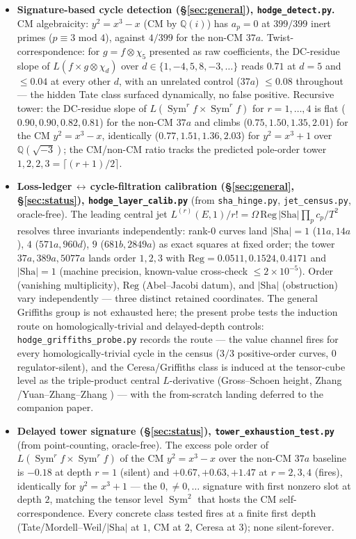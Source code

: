 \documentclass[11pt]{article}
\theoremstyle{definition}
\newcommand{\Sym}{\operatorname{Sym}}
\newcommand{\Sha}{\mathrm{Sha}}
\begin{document}
\begin{itemize}
\item \textbf{Signature-based cycle detection (\S\ref{sec:general}), \texttt{hodge\_detect.py}.} CM
algebraicity: $y^2=x^3-x$ (CM by $\mathbb Q(i)$) has $a_p=0$ at $399/399$ inert primes ($p\equiv3$ mod $4$),
against $4/399$ for the non-CM $37a$. Twist-correspondence: for $g=f\otimes\chi_5$ presented as raw
coefficients, the DC-residue slope of $L(f\times g\otimes\chi_d)$ over $d\in\{1,-4,5,8,-3,\dots\}$ reads
$0.71$ at $d=5$ and $\le0.04$ at every other $d$, with an unrelated control ($37a$) $\le0.08$ throughout ---
the hidden Tate class surfaced dynamically, no false positive. Recursive tower: the DC-residue slope of
$L(\Sym^r f\times\Sym^r f)$ for $r=1,\dots,4$ is flat ($0.90,0.90,0.82,0.81$) for the non-CM $37a$ and
climbs ($0.75,1.50,1.35,2.01$) for the CM $y^2=x^3-x$, identically ($0.77,1.51,1.36,2.03$) for
$y^2=x^3+1$ over $\mathbb Q(\sqrt{-3})$; the CM/non-CM ratio tracks the predicted pole-order tower
$1,2,2,3=\lceil(r{+}1)/2\rceil$.

\item \textbf{Loss-ledger\,$\leftrightarrow$\,cycle-filtration calibration (\S\ref{sec:general},
\S\ref{sec:status}), \texttt{hodge\_layer\_calib.py}} (from \texttt{sha\_hinge.py}, \texttt{jet\_census.py},
oracle-free). The leading central jet $L^{(r)}(E,1)/r!=\Omega\,\mathrm{Reg}\,|\Sha|\prod_p c_p/T^2$ resolves
three invariants independently: rank-$0$ curves land $|\Sha|=1$ ($11a,14a$), $4$ ($571a,960d$), $9$
($681b,2849a$) as exact squares at fixed order; the tower $37a,389a,5077a$ lands order $1,2,3$ with
$\mathrm{Reg}=0.0511,0.1524,0.4171$ and $|\Sha|=1$ (machine precision, known-value cross-check $\le
2\times10^{-5}$). Order (vanishing multiplicity), $\mathrm{Reg}$ (Abel--Jacobi datum), and $|\Sha|$
(obstruction) vary independently --- three distinct retained coordinates. The general Griffiths group is
not exhausted here; the present probe tests the induction route on homologically-trivial and delayed-depth
controls: \texttt{hodge\_griffiths\_probe.py} records the route
--- the value channel fires for every homologically-trivial cycle in the census ($3/3$ positive-order
curves, $0$ regulator-silent), and the Ceresa/Griffiths class is induced at the tensor-cube level as the
triple-product central $L$-derivative (Gross--Schoen height, Zhang \cite{ZhangGS}/Yuan--Zhang--Zhang
\cite{YZZ}) --- with the from-scratch landing deferred to the companion paper.

\item \textbf{Delayed tower signature (\S\ref{sec:status}), \texttt{tower\_exhaustion\_test.py}}
(from point-counting, oracle-free). The excess pole order of $L(\Sym^r f\times\Sym^r f)$ of the CM
$y^2=x^3-x$ over the non-CM $37a$ baseline is $-0.18$ at depth $r=1$ (silent) and $+0.67,+0.63,+1.47$ at
$r=2,3,4$ (fires), identically for $y^2=x^3+1$ --- the $0,\neq0,\dots$ signature with first nonzero slot
at depth $2$, matching the tensor level $\Sym^2$ that hosts the CM self-correspondence. Every concrete
class tested fires at a finite first depth (Tate/Mordell--Weil/$|\Sha|$ at $1$, CM at $2$, Ceresa at $3$);
none silent-forever.
\end{itemize}
\end{document}
